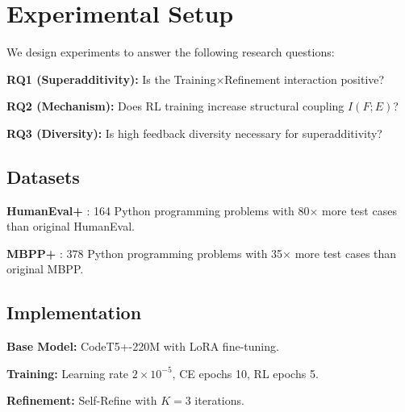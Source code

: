 \section{Experimental Setup}
\label{sec:experiments}

We design experiments to answer the following research questions:

\textbf{RQ1 (Superadditivity):} Is the Training$\times$Refinement interaction positive?

\textbf{RQ2 (Mechanism):} Does RL training increase structural coupling $I(F;E)$?

\textbf{RQ3 (Diversity):} Is high feedback diversity necessary for superadditivity?

\subsection{Datasets}

\textbf{HumanEval+} \citep{liu2024evalplus}: 164 Python programming problems with 80$\times$ more test cases than original HumanEval.

\textbf{MBPP+} \citep{liu2024evalplus}: 378 Python programming problems with 35$\times$ more test cases than original MBPP.

\subsection{Implementation}

\textbf{Base Model:} CodeT5+-220M \citep{wang2023codet5plus} with LoRA \citep{hu2022lora} fine-tuning.

\textbf{Training:} Learning rate $2 \times 10^{-5}$, CE epochs 10, RL epochs 5.

\textbf{Refinement:} Self-Refine \citep{madaan2023selfrefine} with $K=3$ iterations.
